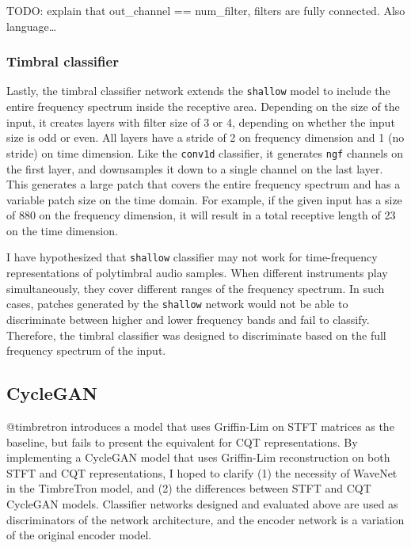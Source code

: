 \documentclass[]{report}
\begin{document}
TODO: explain that out\_channel == num\_filter, filters are fully
connected. Also language\ldots{}

\hypertarget{timbral-classifier}{%
\subsubsection{Timbral classifier}\label{timbral-classifier}}

Lastly, the timbral classifier network extends the \texttt{shallow}
model to include the entire frequency spectrum inside the receptive
area. Depending on the size of the input, it creates layers with filter
size of 3 or 4, depending on whether the input size is odd or even. All
layers have a stride of 2 on frequency dimension and 1 (no stride) on
time dimension. Like the \texttt{conv1d} classifier, it generates
\texttt{ngf} channels on the first layer, and downsamples it down to a
single channel on the last layer. This generates a large patch that
covers the entire frequency spectrum and has a variable patch size on
the time domain. For example, if the given input has a size of 880 on
the frequency dimension, it will result in a total receptive length of
23 on the time dimension.

I have hypothesized that \texttt{shallow} classifier may not work for
time-frequency representations of polytimbral audio samples. When
different instruments play simultaneously, they cover different ranges
of the frequency spectrum. In such cases, patches generated by the
\texttt{shallow} network would not be able to discriminate between
higher and lower frequency bands and fail to classify. Therefore, the
timbral classifier was designed to discriminate based on the full
frequency spectrum of the input.

\hypertarget{cyclegan-1}{%
\subsection{CycleGAN}\label{cyclegan-1}}

@timbretron introduces a model that uses Griffin-Lim on STFT matrices as
the baseline, but fails to present the equivalent for CQT
representations. By implementing a CycleGAN model that uses Griffin-Lim
reconstruction on both STFT and CQT representations, I hoped to clarify
(1) the necessity of WaveNet in the TimbreTron model, and (2) the
differences between STFT and CQT CycleGAN models. Classifier networks
designed and evaluated above are used as discriminators of the network
architecture, and the encoder network is a variation of the original
encoder model.
\end{document}

